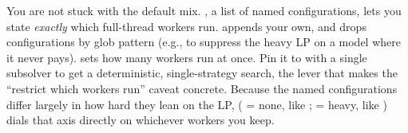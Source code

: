\begin{platypusparam}[htb]
You are not stuck with the default mix. , a list of named configurations, lets you state
\emph{exactly} which full-thread workers run.  appends
your own, and  drops configurations by glob pattern
(e.g.,  to suppress the heavy LP on a model where it never pays).
 sets how many workers run
at once. Pin it to  with a single subsolver to get a deterministic,
single-strategy search, the lever that makes the ``restrict which workers run''
caveat concrete. Because the named configurations differ largely in how
hard they lean on the LP,  ( = none, like ;
 = heavy, like ) dials that axis directly on whichever
workers you keep.
\end{platypusparam}

